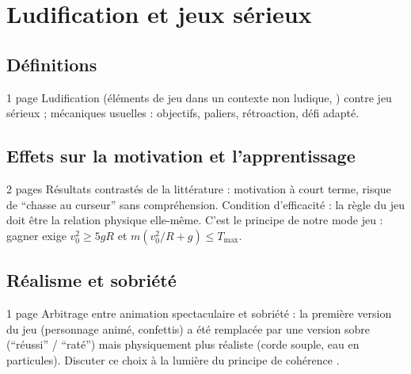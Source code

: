 
\chapter{Ludification et jeux sérieux}
\label{chap:ludification}

\section{Définitions}

\begin{arediger}{1 page}
Ludification (éléments de jeu dans un contexte non ludique,
\cite{deterding2011}) contre jeu sérieux ; mécaniques usuelles : objectifs,
paliers, rétroaction, défi adapté.
\end{arediger}

\section{Effets sur la motivation et l'apprentissage}

\begin{arediger}{2 pages}
Résultats contrastés de la littérature : motivation à court terme, risque de
\enquote{chasse au curseur} sans compréhension. Condition d'efficacité : la
règle du jeu doit être la relation physique elle-même. C'est le principe de
notre mode jeu : gagner exige \(v_0^2 \geq 5 g R\) et \(m (v_0^2/R + g) \leq T_{\max}\).
\end{arediger}

\section{Réalisme et sobriété}

\begin{arediger}{1 page}
Arbitrage entre animation spectaculaire et sobriété : la première version du
jeu (personnage animé, confettis) a été remplacée par une version sobre
(\enquote{réussi} / \enquote{raté}) mais physiquement plus réaliste (corde
souple, eau en particules). Discuter ce choix à la lumière du principe de
cohérence \parencite{mayer2009}.
\end{arediger}
